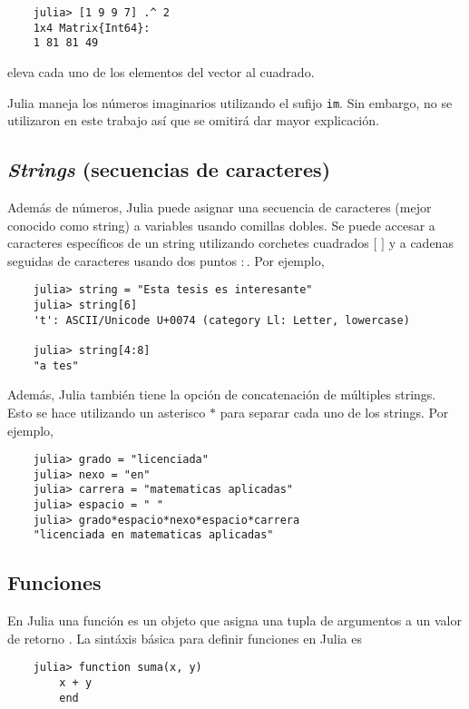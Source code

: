 \begin{verbatim}
	julia> [1 9 9 7] .^ 2
	1x4 Matrix{Int64}:
	1 81 81 49
\end{verbatim}

 \noindent eleva cada uno de los elementos del vector al cuadrado. 

\textsf{Julia} maneja los números imaginarios utilizando el sufijo \texttt{im}. Sin embargo, no se utilizaron en este trabajo así que se omitirá dar mayor explicación. 

\subsection{\textit{Strings} (secuencias de caracteres)} 

Además de números, \textsf{Julia} puede asignar una secuencia de caracteres (mejor conocido como string) a variables usando comillas dobles. Se puede accesar a caracteres específicos de un string utilizando corchetes cuadrados $[$ $]$ y a cadenas seguidas de caracteres usando dos puntos $:$. Por ejemplo,

\begin{verbatim}
    julia> string = "Esta tesis es interesante"
    julia> string[6]
    't': ASCII/Unicode U+0074 (category Ll: Letter, lowercase)
    
    julia> string[4:8]
    "a tes"
\end{verbatim}

Además, \textsf{Julia} también tiene la opción de concatenación de múltiples strings. Esto se hace utilizando un asterisco $*$ para separar cada uno de los strings. Por ejemplo,

\begin{verbatim}
	julia> grado = "licenciada"
	julia> nexo = "en"
	julia> carrera = "matematicas aplicadas"
	julia> espacio = " "
	julia> grado*espacio*nexo*espacio*carrera
	"licenciada en matematicas aplicadas"
\end{verbatim}

\subsection{Funciones}
En \textsf{Julia} una función es un objeto que asigna una tupla de argumentos a un valor de retorno \cite{manual_Julia}. La sintáxis básica para definir funciones en \textsf{Julia} es 

\begin{verbatim}
	julia> function suma(x, y)
		x + y
    	end
\end{verbatim}


